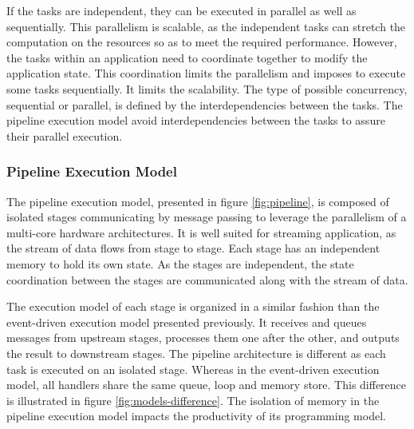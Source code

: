 If the tasks are independent, they can be executed in parallel as well as sequentially.
This parallelism is scalable, as the independent tasks can stretch the computation on the resources so as to meet the required performance.
However, the tasks within an application need to coordinate together to modify the application state.
This coordination limits the parallelism and imposes to execute some tasks sequentially.
It limits the scalability.
The type of possible concurrency, sequential or parallel, is defined by the interdependencies between the tasks.
The pipeline execution model avoid interdependencies between the tasks to assure their parallel execution.

\subsubsection{Pipeline Execution Model}

The pipeline execution model, presented in figure \ref{fig:pipeline}, is composed of isolated stages communicating by message passing to leverage the parallelism of a multi-core hardware architectures.
It is well suited for streaming application, as the stream of data flows from stage to stage.
Each stage has an independent memory to hold its own state.
As the stages are independent, the state coordination between the stages are communicated along with the stream of data.

\begin{figure}
\end{figure}

The execution model of each stage is organized in a similar fashion than the event-driven execution model presented previously.
It receives and queues messages from upstream stages, processes them one after the other, and outputs the result to downstream stages.
The pipeline architecture is different as each task is executed on an isolated stage.
Whereas in the event-driven execution model, all handlers share the same queue, loop and memory store.
This difference is illustrated in figure \ref{fig:models-difference}.
The isolation of memory in the pipeline execution model impacts the productivity of its programming model.

